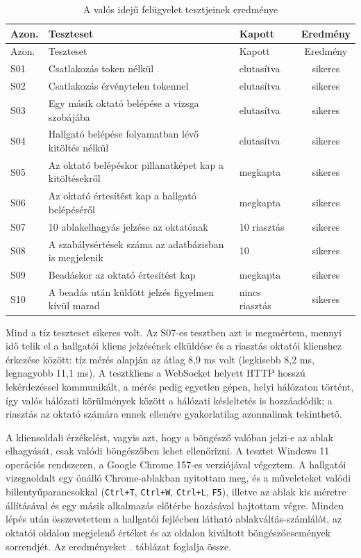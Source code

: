 {\small
\begin{longtable}{@{}lp{8.6cm}p{2.6cm}c@{}}
  \caption{A valós idejű felügyelet tesztjeinek eredménye}\label{tab:socket_tesztek}\\
  \toprule
  Azon. & Teszteset & Kapott & Eredmény \\
  \midrule
  \endfirsthead
  \toprule
  Azon. & Teszteset & Kapott & Eredmény \\
  \midrule
  \endhead
  \bottomrule
  \endfoot
  S01 & Csatlakozás token nélkül & elutasítva & sikeres \\
  S02 & Csatlakozás érvénytelen tokennel & elutasítva & sikeres \\
  S03 & Egy másik oktató belépése a vizsga szobájába & elutasítva & sikeres \\
  S04 & Hallgató belépése folyamatban lévő kitöltés nélkül & elutasítva & sikeres \\
  S05 & Az oktató belépéskor pillanatképet kap a kitöltésekről & megkapta & sikeres \\
  S06 & Az oktató értesítést kap a hallgató belépéséről & megkapta & sikeres \\
  S07 & 10 ablakelhagyás jelzése az oktatónak & 10 riasztás & sikeres \\
  S08 & A szabálysértések száma az adatbázisban is megjelenik & 10 & sikeres \\
  S09 & Beadáskor az oktató értesítést kap & megkapta & sikeres \\
  S10 & A beadás után küldött jelzés figyelmen kívül marad & nincs riasztás & sikeres \\
\end{longtable}
}

Mind a tíz teszteset sikeres volt. Az S07-es tesztben azt is megmértem, mennyi idő telik el a
hallgatói kliens jelzésének elküldése és a riasztás oktatói klienshez érkezése között: tíz mérés
alapján az átlag 8,9 ms volt (legkisebb 8,2 ms, legnagyobb 11,1 ms). A tesztkliens a WebSocket
helyett HTTP hosszú lekérdezéssel kommunikált, a mérés pedig egyetlen gépen, helyi hálózaton
történt, így valós hálózati körülmények között a hálózati késleltetés is hozzáadódik; a riasztás
az oktató számára ennek ellenére gyakorlatilag azonnalinak tekinthető.

A kliensoldali érzékelést, vagyis azt, hogy a böngésző valóban jelzi-e az ablak elhagyását, csak
valódi böngészőben lehet ellenőrizni. A tesztet Windows 11 operációs rendszeren, a Google Chrome
157-es verziójával végeztem. A hallgatói vizsgaoldalt egy önálló Chrome-ablakban nyitottam meg,
és a műveleteket valódi billentyűparancsokkal (\texttt{Ctrl+T}, \texttt{Ctrl+W}, \texttt{Ctrl+L},
\texttt{F5}), illetve az ablak kis méretre állításával és egy másik alkalmazás előtérbe hozásával
hajtottam végre. Minden lépés után összevetettem a hallgatói fejlécben látható ablakváltás-számlálót,
az oktatói oldalon megjelenő értéket és az oldalon kiváltott böngészőesemények sorrendjét. Az
eredményeket . táblázat foglalja össze.

